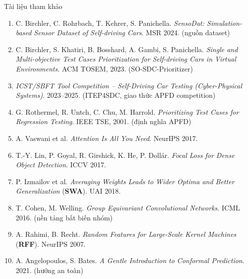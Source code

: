 \documentclass[aspectratio=169,10pt]{beamer}
\begin{document}
\begin{frame}{Tài liệu tham khảo}
\footnotesize
\begin{enumerate}\setlength{\itemsep}{0.32em}
  \item C. Birchler, C. Rohrbach, T. Kehrer, S. Panichella. \textit{SensoDat: Simulation-based Sensor Dataset of Self-driving Cars}. MSR 2024. {\scriptsize\color{gray}(nguồn dataset)}
  \item C. Birchler, S. Khatiri, B. Bosshard, A. Gambi, S. Panichella. \textit{Single and Multi-objective Test Cases Prioritization for Self-driving Cars in Virtual Environments}. ACM TOSEM, 2023. {\scriptsize\color{gray}(SO-SDC-Prioritizer)}
  \item \textit{ICST/SBFT Tool Competition -- Self-Driving Car Testing (Cyber-Physical Systems)}. 2023--2025. {\scriptsize\color{gray}(ITEP4SDC, giao thức APFD competition)}
  \item G. Rothermel, R. Untch, C. Chu, M. Harrold. \textit{Prioritizing Test Cases for Regression Testing}. IEEE TSE, 2001. {\scriptsize\color{gray}(định nghĩa APFD)}
  \item A. Vaswani et al. \textit{Attention Is All You Need}. NeurIPS 2017.
  \item T.-Y. Lin, P. Goyal, R. Girshick, K. He, P. Dollár. \textit{Focal Loss for Dense Object Detection}. ICCV 2017.
  \item P. Izmailov et al. \textit{Averaging Weights Leads to Wider Optima and Better Generalization} (\textbf{SWA}). UAI 2018.
  \item T. Cohen, M. Welling. \textit{Group Equivariant Convolutional Networks}. ICML 2016. {\scriptsize\color{gray}(nền tảng bất biến nhóm)}
  \item A. Rahimi, B. Recht. \textit{Random Features for Large-Scale Kernel Machines} (\textbf{RFF}). NeurIPS 2007.
  \item A. Angelopoulos, S. Bates. \textit{A Gentle Introduction to Conformal Prediction}. 2021. {\scriptsize\color{gray}(hướng an toàn)}
\end{enumerate}
\end{frame}
\end{document}
